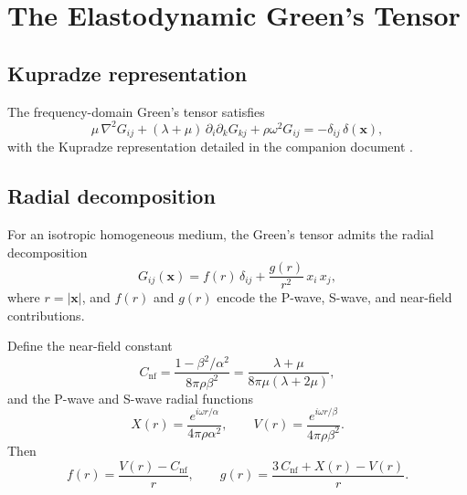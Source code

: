 \documentclass[11pt,a4paper]{article}
\newcommand{\bx}{\mathbf{x}}
\begin{document}
\section{The Elastodynamic Green's Tensor}
\label{sec:greens}

\subsection{Kupradze representation}

The frequency-domain Green's tensor satisfies
\begin{equation}
  \mu\,\nabla^2 G_{ij}
  + (\lambda + \mu)\,\partial_i\partial_k G_{kj}
  + \rho\omega^2 G_{ij}
  = -\delta_{ij}\,\delta(\bx),
  \label{eq:pde}
\end{equation}
with the Kupradze representation \citep{Kupradze1963,Kausel2006}
detailed in the companion document \citep[see][for
derivation]{WuBenMenahem1985}.

\subsection{Radial decomposition}

For an isotropic homogeneous medium, the Green's tensor admits the
radial decomposition
\begin{equation}
  \boxed{
  G_{ij}(\bx) = f(r)\,\delta_{ij}
    + \frac{g(r)}{r^2}\,x_i\,x_j,
  }
  \label{eq:radial}
\end{equation}
where $r = |\bx|$, and $f(r)$ and $g(r)$ encode the P-wave, S-wave,
and near-field contributions.

Define the near-field constant
\begin{equation}
  C_\text{nf}
  = \frac{1 - \beta^2/\alpha^2}{8\pi\rho\beta^2}
  = \frac{\lambda + \mu}{8\pi\mu(\lambda + 2\mu)},
  \label{eq:Cnf}
\end{equation}
and the P-wave and S-wave radial functions
\begin{equation}
  X(r) = \frac{e^{i\omega r/\alpha}}{4\pi\rho\alpha^2},
  \qquad
  V(r) = \frac{e^{i\omega r/\beta}}{4\pi\rho\beta^2}.
  \label{eq:XV}
\end{equation}
Then
\begin{equation}
  f(r) = \frac{V(r) - C_\text{nf}}{r},
  \qquad
  g(r) = \frac{3\,C_\text{nf} + X(r) - V(r)}{r}.
  \label{eq:fg}
\end{equation}
\end{document}
